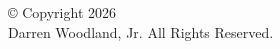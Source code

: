 \thispagestyle{empty}
\vspace*{\fill}
\begin{center}
	© Copyright 2026\\
	Darren Woodland, Jr. All Rights Reserved.
\end{center}
\vspace*{\fill}